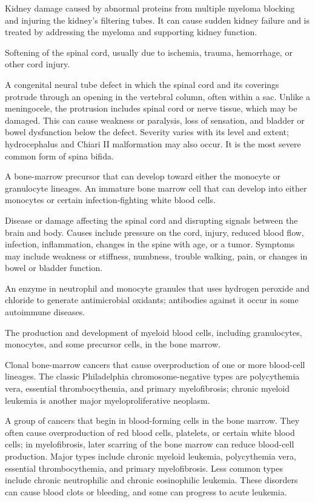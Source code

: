  Kidney damage caused by abnormal proteins from multiple myeloma blocking and injuring the kidney's filtering tubes. It can cause sudden kidney failure and is treated by addressing the myeloma and supporting kidney function.

 Softening of the spinal cord, usually due to ischemia, trauma, hemorrhage, or other cord injury.

 A congenital neural tube defect in which the spinal cord and its coverings protrude through an opening in
the vertebral column, often within a sac. Unlike a meningocele, the protrusion includes spinal cord or nerve tissue, which
may be damaged. This can cause weakness or paralysis, loss of sensation, and bladder or bowel dysfunction below the
defect. Severity varies with its level and extent; hydrocephalus and Chiari II malformation may also occur. It is the
most severe common form of spina bifida.

 A bone-marrow precursor that can develop toward either the monocyte or granulocyte lineages. An immature bone marrow cell that can develop into either monocytes or certain infection-fighting white blood cells.

 Disease or damage affecting the spinal cord and disrupting signals between the brain and body. Causes include pressure on the cord, injury, reduced blood flow, infection, inflammation, changes in the spine with age, or a tumor. Symptoms may include weakness or stiffness, numbness, trouble walking, pain, or changes in bowel or bladder function.

 An enzyme in neutrophil and monocyte granules that uses hydrogen peroxide and chloride to generate antimicrobial oxidants; antibodies against it occur in some autoimmune diseases.

 The production and development of myeloid blood cells, including granulocytes, monocytes, and some precursor cells, in the bone marrow.

 Clonal bone-marrow cancers that cause overproduction of one or more blood-cell lineages. The classic Philadelphia chromosome-negative types are polycythemia vera, essential thrombocythemia, and primary myelofibrosis; chronic myeloid leukemia is another major myeloproliferative neoplasm.

 A group of cancers that begin in blood-forming cells in the bone marrow. They often cause overproduction of red blood cells, platelets, or certain white blood cells; in myelofibrosis, later scarring of the bone marrow can reduce blood-cell production. Major types include chronic myeloid leukemia, polycythemia vera, essential thrombocythemia, and primary myelofibrosis. Less common types include chronic neutrophilic and chronic eosinophilic leukemia. These disorders can cause blood clots or bleeding, and some can progress to acute leukemia.

